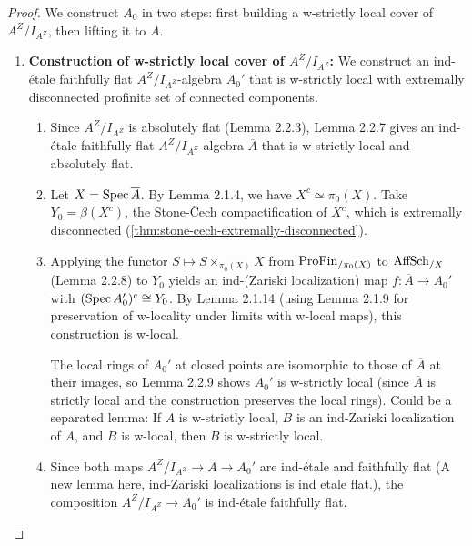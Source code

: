 \begin{proof}
    
    We construct $A_0$ in two steps: first building a w-strictly local cover of $A^Z/I_{A^Z}$, then lifting it to $A$.

    \begin{enumerate}
        \item \textbf{Construction of w-strictly local cover of $A^Z/I_{A^Z}$:} 
        We construct an ind-étale faithfully flat $A^Z/I_{A^Z}$-algebra $A_0'$ that is w-strictly local with extremally disconnected profinite set of connected components.

        \begin{enumerate}
            \item Since $A^Z/I_{A^Z}$ is absolutely flat (Lemma 2.2.3), Lemma 2.2.7 gives an ind-étale faithfully flat $A^Z/I_{A^Z}$-algebra $\overline{A}$ that is w-strictly local and absolutely flat.

            \item Let $X = \operatorname{Spec} \overline{A}$. By Lemma 2.1.4, we have $X^c \simeq \pi_0(X)$. Take $Y_0 = \beta(X^c)$, the Stone-Čech compactification of $X^c$, which is extremally disconnected (\cref{thm:stone-cech-extremally-disconnected}).

            \item Applying the functor $S \mapsto S \times_{\pi_0(X)} X$ from $\operatorname{ProFin}_{/\pi_0(X)}$ to $\operatorname{AffSch}_{/X}$ (Lemma 2.2.8) to $Y_0$ yields an ind-(Zariski localization) map $f: \overline{A} \to A_0'$ with $(\operatorname{Spec} A_0')^c \cong Y_0$. By Lemma 2.1.14 (using Lemma 2.1.9 for preservation of w-locality under limits with w-local maps), this construction is w-local.

            The local rings of $A_0'$ at closed points are isomorphic to those of $\overline{A}$ at their images, so Lemma 2.2.9 shows $A_0'$ is w-strictly local (since $\overline{A}$ is strictly local and the construction preserves the local rings). {\red Could be a separated lemma: If $A$ is w-strictly local, $B$ is an ind-Zariski localization of $A$, and $B$ is w-local, then $B$ is w-strictly local.}

            \item Since both maps \(A^Z/I_{A^Z} \to \bar{A} \to A_0'\) are ind-étale and faithfully flat {(\red A new lemma here, ind-Zariski localizations is ind etale flat.)}, the composition $A^Z/I_{A^Z} \to A_0'$ is ind-étale faithfully flat.
        \end{enumerate}
        

\end{enumerate}
\end{proof}
